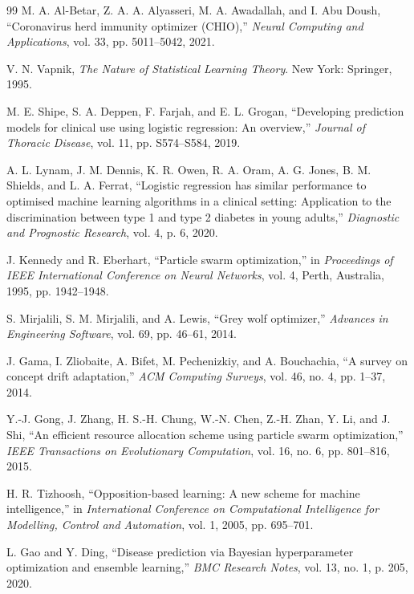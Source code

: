 \documentclass[letterpaper, 10 pt, conference]{ieeeconf}
\begin{document}
\begin{thebibliography}{99}
	 M. A. Al-Betar, Z. A. A. Alyasseri, M. A. Awadallah, and I. Abu Doush, ``Coronavirus herd immunity optimizer (CHIO),'' \emph{Neural Computing and Applications}, vol. 33, pp. 5011--5042, 2021.

	 V. N. Vapnik, \emph{The Nature of Statistical Learning Theory}. New York: Springer, 1995.

	 M. E. Shipe, S. A. Deppen, F. Farjah, and E. L. Grogan, ``Developing prediction models for clinical use using logistic regression: An overview,'' \emph{Journal of Thoracic Disease}, vol. 11, pp. S574--S584, 2019.

	 A. L. Lynam, J. M. Dennis, K. R. Owen, R. A. Oram, A. G. Jones, B. M. Shields, and L. A. Ferrat, ``Logistic regression has similar performance to optimised machine learning algorithms in a clinical setting: Application to the discrimination between type 1 and type 2 diabetes in young adults,'' \emph{Diagnostic and Prognostic Research}, vol. 4, p. 6, 2020.

	 J. Kennedy and R. Eberhart, ``Particle swarm optimization,'' in \emph{Proceedings of IEEE International Conference on Neural Networks}, vol. 4, Perth, Australia, 1995, pp. 1942--1948.

	 S. Mirjalili, S. M. Mirjalili, and A. Lewis, ``Grey wolf optimizer,'' \emph{Advances in Engineering Software}, vol. 69, pp. 46--61, 2014.

	 J. Gama, I. Zliobaite, A. Bifet, M. Pechenizkiy, and A. Bouchachia, ``A survey on concept drift adaptation,'' \emph{ACM Computing Surveys}, vol. 46, no. 4, pp. 1--37, 2014.

	 Y.-J. Gong, J. Zhang, H. S.-H. Chung, W.-N. Chen, Z.-H. Zhan, Y. Li, and J. Shi, ``An efficient resource allocation scheme using particle swarm optimization,'' \emph{IEEE Transactions on Evolutionary Computation}, vol. 16, no. 6, pp. 801--816, 2015.

	 H. R. Tizhoosh, ``Opposition-based learning: A new scheme for machine intelligence,'' in \emph{International Conference on Computational Intelligence for Modelling, Control and Automation}, vol. 1, 2005, pp. 695--701.

	 L. Gao and Y. Ding, ``Disease prediction via Bayesian hyperparameter optimization and ensemble learning,'' \emph{BMC Research Notes}, vol. 13, no. 1, p. 205, 2020.


\end{thebibliography}
\end{document}
